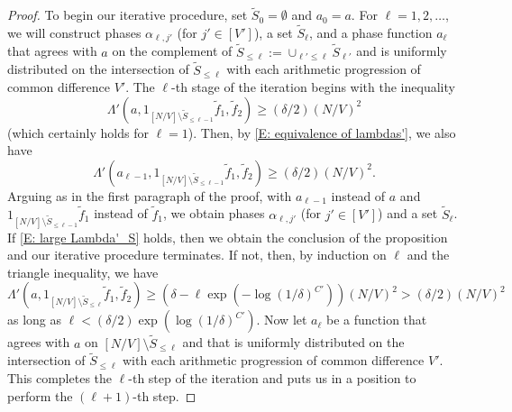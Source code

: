 \documentclass[11pt]{amsart}
\theoremstyle{definition}
\begin{document}
\begin{proof}
To begin our iterative procedure, set $\widetilde S_0=\emptyset$ and $a_0=a$.  For $\ell=1,2, \ldots$, we will construct phases $\alpha_{\ell,j'}$ (for $j' \in [V']$), a set $\widetilde S_\ell$, and a phase function $a_\ell$ that agrees with $a$ on the complement of $\widetilde S_{\leq \ell}:=\cup_{\ell'\leq \ell} \widetilde S_{\ell'}$ and is uniformly distributed on the intersection of $\widetilde S_{\leq \ell}$ with each arithmetic progression of common difference $V'$.  The $\ell$-th stage of the iteration begins with the inequality
$$\Lambda'(a, 1_{[N/V]\setminus \tilde{S}_{\leq \ell-1}}\widetilde f_1, \widetilde f_2)\geq (\delta/2)(N/V)^2$$
(which certainly holds for $\ell=1$).  Then, by \eqref{E: equivalence of lambdas'}, we also have
$$\Lambda'(a_{\ell-1}, 1_{[N/V]\setminus \tilde{S}_{\leq \ell-1}}\widetilde f_1, \widetilde f_2)\geq (\delta/2)(N/V)^2.$$
Arguing as in the first paragraph of the proof, with $a_{\ell-1}$ instead of $a$ and $1_{[N/V]\setminus \tilde{S}_{\leq \ell-1}}\widetilde f_1$ instead of $\widetilde f_1$, we obtain phases $\alpha_{\ell,j'}$ (for $j' \in [V']$) and a set $\widetilde S_\ell$.  If \eqref{E: large Lambda'_S} holds, then we obtain the conclusion of the proposition and our iterative procedure terminates.  If not, then, by induction on $\ell$ and the triangle inequality, we have
\begin{equation}\label{eq:iterative-loss-lambda'}
\Lambda'(a, 1_{[N/V]\setminus \widetilde S_{\leq \ell}}\widetilde f_1, \widetilde f_2) \geq (\delta - \ell\exp(-\log(1/\delta)^{C'}))(N/V)^2 > (\delta/2) (N/V)^2
\end{equation}
as long as $\ell<(\delta/2)\exp(\log(1/\delta)^{C'})$.  Now let $a_\ell$ be a function that agrees with $a$ on $[N/V] \setminus \widetilde S_{\leq \ell}$ and that is uniformly distributed on the intersection of $\widetilde S_{\leq \ell}$ with each arithmetic progression of common difference $V'$.  This completes the $\ell$-th step of the iteration and puts us in a position to perform the $(\ell+1)$-th step.


\end{proof}
\end{document}
